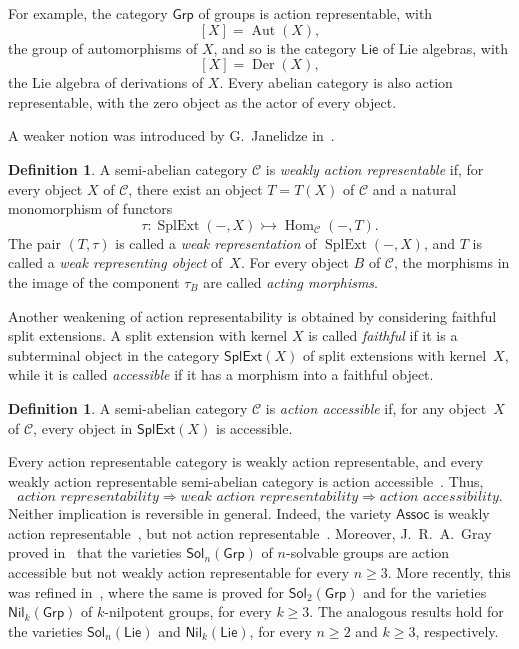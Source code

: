 \documentclass[reqno,a4paper]{amsart}
\theoremstyle{plain}
\theoremstyle{definition}
\newtheorem{definition}[subsection]{Definition}
\theoremstyle{remark}
\numberwithin{equation}{section}
\newcommand{\cC}{\ensuremath{\mathcal{C}}}
\DeclareMathOperator{\Aut}{Aut}
\DeclareMathOperator{\Hom}{Hom}
\DeclareMathOperator{\SplExt}{SplExt}
\DeclareMathOperator{\Der}{Der}
\newcommand{\Assoc}{\ensuremath{\mathsf{Assoc}}}
\newcommand{\Lie}{\ensuremath{\mathsf{Lie}}}
\newcommand{\Nil}{\ensuremath{\mathsf{Nil}}}
\newcommand{\Sol}{\ensuremath{\mathsf{Sol}}}
\newcommand{\Grp}{\ensuremath{\mathsf{Grp}}}
\newcommand{\SplExtX}{\ensuremath{\mathsf{SplExt}(X)}}
\begin{document}
For example, the category $\Grp$ of groups is action representable, with
\[
[X]=\Aut(X),
\]
the group of automorphisms of $X$, and so is the category $\Lie$ of Lie algebras, with
\[
[X]=\Der(X),
\]
the Lie algebra of derivations of $X$. Every abelian category is also action representable, with the zero object as the actor of every object.

A weaker notion was introduced by G.~Janelidze in~\cite{WRA}.

\begin{definition}\cite{WRA}
A semi-abelian category $\cC$ is \emph{weakly action representable} if, for every object $X$ of $\cC$, there exist an object $T=T(X)$ of $\cC$ and a natural monomorphism of functors
\[
\tau\colon\SplExt(-,X)\rightarrowtail\Hom_{\cC}(-,T).
\]
The pair $(T,\tau)$ is called a \emph{weak representation} of $\SplExt(-,X)$, and $T$ is called a \emph{weak representing object} of~$X$. For every object $B$ of $\cC$, the morphisms in the image of the component $\tau_B$ are called \emph{acting morphisms}.
\end{definition}

Another weakening of action representability is obtained by considering faithful split extensions. A split extension with kernel $X$ is called \emph{faithful} if it is a subterminal object in the category $\SplExtX$ of split extensions with kernel~$X$, while it is called \emph{accessible} if it has a morphism into a faithful object.

\begin{definition}\cite{act_accessible}
A semi-abelian category $\cC$ is \emph{action accessible} if, for any object~$X$ of $\cC$, every object in $\SplExtX$ is accessible.
\end{definition}

Every action representable category is weakly action representable, and every weakly action representable semi-abelian category is action accessible~\cite{WRA}. Thus,
\[
\textit{action representability}
\Longrightarrow
\textit{weak action representability}
\Longrightarrow
\textit{action accessibility}.
\]
Neither implication is reversible in general. Indeed, the variety $\Assoc$ is weakly action representable~\cite{WRA}, but not action representable~\cite{Tim}. Moreover, J.~R.~A.~Gray proved in~\cite{Gray} that the varieties $\Sol_n(\Grp)$ of $n$-solvable groups are action accessible but not weakly action representable for every $n\geq3$. More recently, this was refined in~\cite{XabiMancini}, where the same is proved for $\Sol_2(\Grp)$ and for the varieties $\Nil_k(\Grp)$ of $k$-nilpotent groups, for every $k\geq3$. The analogous results hold for the varieties $\Sol_n(\Lie)$ and $\Nil_k(\Lie)$, for every $n\geq2$ and $k\geq3$, respectively.
\end{document}

